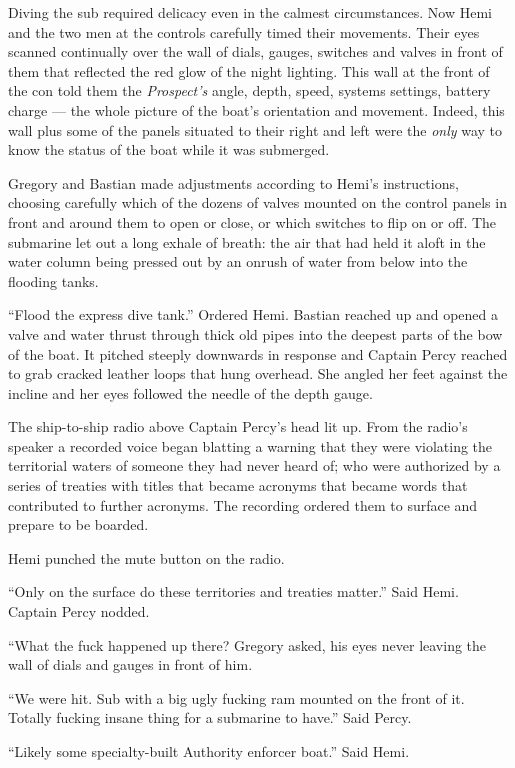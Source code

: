 \documentclass[
]{scrbook}
\begin{document}
Diving the sub required delicacy even in the calmest circumstances. Now
Hemi and the two men at the controls carefully timed their movements.
Their eyes scanned continually over the wall of dials, gauges, switches
and valves in front of them that reflected the red glow of the night
lighting. This wall at the front of the con told them the
\emph{Prospect's} angle, depth, speed, systems settings, battery charge
--- the whole picture of the boat's orientation and movement. Indeed,
this wall plus some of the panels situated to their right and left were
the \emph{only} way to know the status of the boat while it was
submerged.

Gregory and Bastian made adjustments according to Hemi's instructions,
choosing carefully which of the dozens of valves mounted on the control
panels in front and around them to open or close, or which switches to
flip on or off. The submarine let out a long exhale of breath: the air
that had held it aloft in the water column being pressed out by an
onrush of water from below into the flooding tanks.

``Flood the express dive tank.'' Ordered Hemi. Bastian reached up and
opened a valve and water thrust through thick old pipes into the deepest
parts of the bow of the boat. It pitched steeply downwards in response
and Captain Percy reached to grab cracked leather loops that hung
overhead. She angled her feet against the incline and her eyes followed
the needle of the depth gauge.

The ship-to-ship radio above Captain Percy's head lit up. From the
radio's speaker a recorded voice began blatting a warning that they were
violating the territorial waters of someone they had never heard of; who
were authorized by a series of treaties with titles that became acronyms
that became words that contributed to further acronyms. The recording
ordered them to surface and prepare to be boarded.

Hemi punched the mute button on the radio.

``Only on the surface do these territories and treaties matter.'' Said
Hemi. Captain Percy nodded.

``What the fuck happened up there? Gregory asked, his eyes never leaving
the wall of dials and gauges in front of him.

``We were hit. Sub with a big ugly fucking ram mounted on the front of
it. Totally fucking insane thing for a submarine to have.'' Said Percy.

``Likely some specialty-built Authority enforcer boat.'' Said Hemi.
\end{document}
